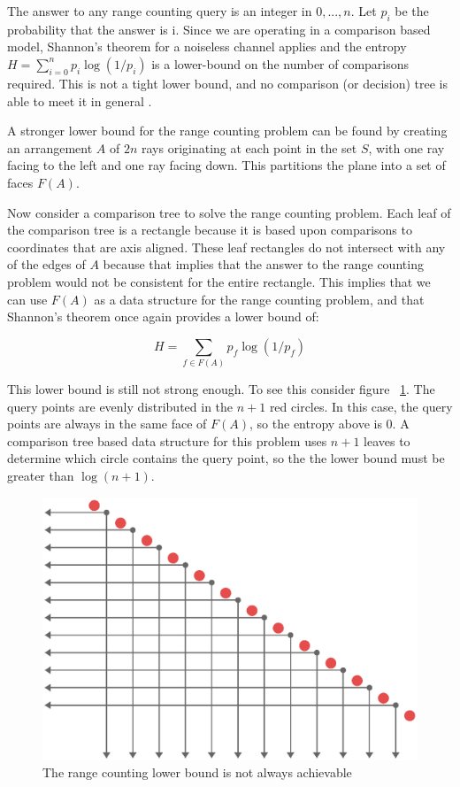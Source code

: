 \documentclass[mcs]{scsthesis}
\begin{document}
The answer to any range counting query is an integer in \({0, ..., n}\). Let
\(p_i\) be the probability that the answer is i. Since we are operating in a
comparison based model, Shannon's theorem for a noiseless channel applies and
the entropy \(H=\sum_{i=0}^n{p_i\log(1/p_i)}\) is a lower-bound on the number of
comparisons required. This is not a tight lower bound, and no comparison (or
decision) tree is able to meet it in general \cite{biasedrange}.

A stronger lower bound for the range counting problem can be found by creating
an arrangement \(A\) of \(2n\) rays originating at each point in the set \(S\),
with one ray facing to the left and one ray facing down. This partitions the
plane into a set of faces \(F(A)\).

Now consider a comparison tree to solve the range counting problem. Each leaf of
the comparison tree is a rectangle because it is based upon comparisons to
coordinates that are axis aligned.  These leaf rectangles do not intersect with
any of the edges of \(A\) because that implies that the answer to the range
counting problem would not be consistent for the entire rectangle. This implies
that we can use \(F(A)\) as a data structure for the range counting problem,
and that Shannon's theorem once again provides a lower bound of:

$$
H=\sum_{f \in F(A)}{p_f\log(1/p_f)}
$$

This lower bound is still not strong enough. To see this consider figure
~\ref{fig:rangelb}. The query points are evenly distributed in the \(n + 1\)
red circles. In this case, the query points are always in the same face of
\(F(A)\), so the entropy above is 0. A comparison tree based data structure
for this problem uses \(n + 1\) leaves to determine which circle contains
the query point, so the the lower bound must be greater than \(\log(n + 1)\).

\begin{figure}
\begin{center}
\includegraphics[scale=0.6]{diagrams/range_counting.eps}
\caption{The range counting lower bound is not always achievable}
\label{fig:rangelb}
\end{center}
\end{figure}
\end{document}
